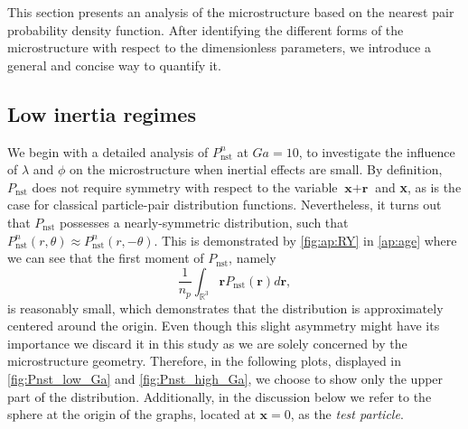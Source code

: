 This section presents an analysis of the microstructure based on the nearest pair probability density function. %
After identifying the different forms of the microstructure with respect to the dimensionless parameters, we introduce a general and concise way to quantify it.


\subsection{Low inertia regimes}
We begin with a detailed analysis of $P_\text{nst}^n$ at $Ga =10$, to investigate the influence of $\lambda$ and $\phi$ on the microstructure when inertial effects are small.
By definition, $P_\text{nst}$ does not require symmetry with respect to the variable $\textbf{x}+\textbf{r}$ and \textbf{x}, as is the case for classical particle-pair distribution functions. 
Nevertheless, it turns out that $P_\text{nst}$ possesses a nearly-symmetric distribution, such that  $P_\text{nst}^n(r,\theta)\approx P_\text{nst}^n(r,- \theta)$. 
This is demonstrated by \ref{fig:ap:RY} in \ref{ap:age} where we can see that the first moment of $P_\text{nst}$, namely
\begin{equation*}
    \frac{1}{n_p}\int_{\mathbb{R}^3} \textbf{r} P_\text{nst}(\textbf{r}) d\textbf{r},
\end{equation*}
is reasonably small, which demonstrates that the distribution is approximately centered around the origin. 
Even though this slight asymmetry might have its importance \cite{zhang2023evolution} we discard it in this study as we are solely concerned by the microstructure geometry. 
Therefore, in the following plots, displayed in \ref{fig:Pnst_low_Ga} and \ref{fig:Pnst_high_Ga}, we choose to show only the upper part of the distribution.
Additionally, in the discussion below we refer to the sphere at the origin of the graphs, located at $\textbf{x}=0$, as the \textit{test particle}.%


